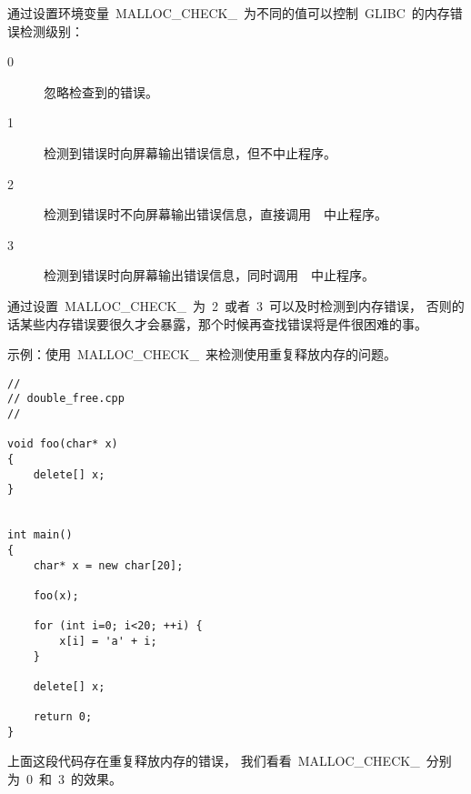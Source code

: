 通过设置环境变量~MALLOC\_CHECK\_~为不同的值可以控制~GLIBC~的内存错误检测级别：

\begin{description}
\item[0] 忽略检查到的错误。
\item[1] 检测到错误时向屏幕输出错误信息，但不中止程序。
\item[2] 检测到错误时不向屏幕输出错误信息，直接调用~~中止程序。
\item[3] 检测到错误时向屏幕输出错误信息，同时调用~~中止程序。
\end{description}

通过设置~MALLOC\_CHECK\_~为~2~或者~3~可以及时检测到内存错误，
否则的话某些内存错误要很久才会暴露，那个时候再查找错误将是件很困难的事。

示例：使用~MALLOC\_CHECK\_~来检测使用重复释放内存的问题。

\begin{lstlisting}
//
// double_free.cpp
//

void foo(char* x)
{
    delete[] x;
}


int main()
{
    char* x = new char[20];

    foo(x);

    for (int i=0; i<20; ++i) {
        x[i] = 'a' + i;
    }

    delete[] x;

    return 0;
}
\end{lstlisting}

上面这段代码存在重复释放内存的错误，
我们看看~MALLOC\_CHECK\_~分别为~0~和~3~的效果。

